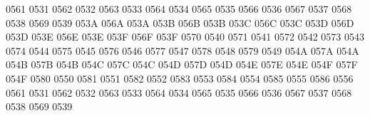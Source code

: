  0561 0531 %
 0562 0532 %
 0563 0533 %
 0564 0534 %
 0565 0535 %
 0566 0536 %
 0567 0537 %
 0568 0538 %
 0569 0539 %
\setcclcucx 053A 056A 053A %
\setcclcucx 053B 056B 053B %
\setcclcucx 053C 056C 053C %
\setcclcucx 053D 056D 053D %
\setcclcucx 053E 056E 053E %
\setcclcucx 053F 056F 053F %
 0570 0540 %
 0571 0541 %
 0572 0542 %
 0573 0543 %
 0574 0544 %
 0575 0545 %
 0576 0546 %
 0577 0547 %
 0578 0548 %
 0579 0549 %
\setcclcucx 054A 057A 054A %
\setcclcucx 054B 057B 054B %
\setcclcucx 054C 057C 054C %
\setcclcucx 054D 057D 054D %
\setcclcucx 054E 057E 054E %
\setcclcucx 054F 057F 054F %
 0580 0550 %
 0581 0551 %
 0582 0552 %
 0583 0553 %
 0584 0554 %
 0585 0555 %
 0586 0556 %
 0561 0531 %
 0562 0532 %
 0563 0533 %
 0564 0534 %
 0565 0535 %
 0566 0536 %
 0567 0537 %
 0568 0538 %
 0569 0539 %

